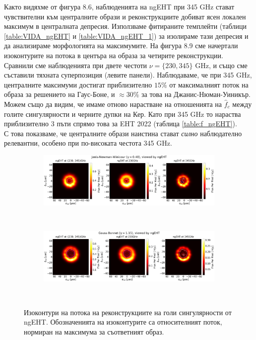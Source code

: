 Както видяхме от фигура 8.6, наблюденията на ngEHT при 345 GHz стават чувствителни към централните образи и реконструкциите добиват ясен локален максимум в централната депресия. Използваме фитираните темплейти (таблици \ref{table:VIDA_ngEHT} и \ref{table:VIDA_ngEHT_1}) за изолираме тази депресия и да анализираме морфологията на максимумите. На фигура 8.9 сме начертали изоконтурите на потока в центъра на образа за четирите реконструкции. Сравнили сме наблюденията при двете честоти $\nu = \{230, 345\}$ GHz, и също сме съставили тяхната суперпозиция (левите панели). Наблюдаваме, че при 345 GHz, централните максимуми достигат приблизително $15\%$ от максималният поток на образа за решението на Гаус-Боне, и $\approx 30\%$ за това на Джанис-Нюман-Уиникър. Можем също да видим, че имаме отново нарастване на отношенията на $\hat{f}_c$ между голите сингулярности и черните дупки на Кер. Като при 345 GHz то нараства приблизително 3 пъти спрямо това за EHT 2022 (таблица \ref{table:f_ngEHT}).\\

С това показваме, че централните образи наистина стават \emph{силно} наблюдателно релевантни, особено при по-високата честота 345 GHz. 

\begin{figure}[h!]
	\centering
	\begin{subfigure}{12cm}
		\hspace{-1.5cm}
		\includegraphics[scale = 0.2]{Superpos_Compare_JNW.png}
	\end{subfigure}\\
	\begin{subfigure}{12cm}
		\hspace{-1.5cm}
		\includegraphics[scale = 0.2]{Superpos_Compare_GB.png}
	\end{subfigure}\\
	\label{isoflux_ngEHT}
	\caption[Изоконтури на потока на реконструкциите на голи сингулярности от ngEHT.]{\small Изоконтури на потока на реконструкциите на голи сингулярности от ngEHT. Обозначенията на изоконтурите са относителният поток, нормиран на максимума за съответният образ.} 
\end{figure}


